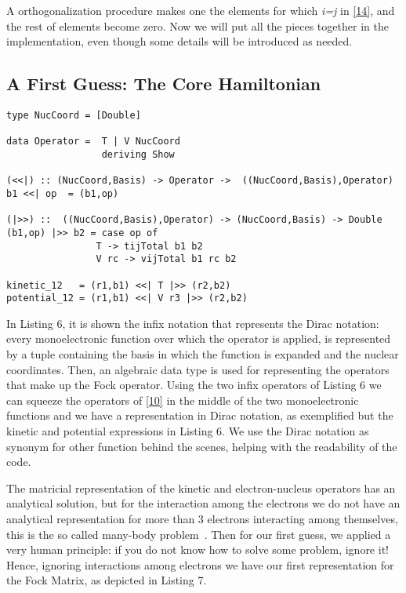 \documentclass{tmr}
\begin{document}
A orthogonalization procedure makes one the elements for which \textit{i=j} in \eqref{14}, and
the rest of elements become zero. Now we will put all the pieces together in the implementation, 
even though some details will be introduced as needed.


\subsection{A First Guess: The Core Hamiltonian}
\begin{lstlisting}[float,captionpos=b,belowcaptionskip=4pt, caption= Operators definition]
type NucCoord = [Double]

data Operator =  T | V NucCoord
                 deriving Show

(<<|) :: (NucCoord,Basis) -> Operator ->  ((NucCoord,Basis),Operator)
b1 <<| op  = (b1,op)

(|>>) ::  ((NucCoord,Basis),Operator) -> (NucCoord,Basis) -> Double
(b1,op) |>> b2 = case op of
                T -> tijTotal b1 b2
                V rc -> vijTotal b1 rc b2

kinetic_12   = (r1,b1) <<| T |>> (r2,b2)
potential_12 = (r1,b1) <<| V r3 |>> (r2,b2)
\end{lstlisting}

In Listing 6, it is shown the infix notation that represents the Dirac notation:
every monoelectronic function over which the operator is applied,
is represented by a tuple containing the basis in which the function is expanded 
and the nuclear coordinates. Then, an algebraic data type is used for representing the
operators that make up the Fock operator. Using the two infix operators of Listing 6
we can squeeze the operators of \eqref{10} in the middle of the
two monoelectronic functions and we have a representation in Dirac notation, as exemplified
but the kinetic and potential expressions in Listing 6. We use the Dirac notation as
synonym for other function behind the scenes, helping with the readability of the code.


The matricial representation of the kinetic and electron-nucleus operators has 
an analytical solution, but for the interaction among the electrons we do not have 
an analytical representation for more than 3 electrons interacting among themselves, this is the so called
many-body problem~\cite{many-body}. Then for our first guess,
we applied a very human principle: if you do not know how to solve some problem, ignore it!
Hence, ignoring interactions among electrons we have our first representation for 
the Fock Matrix, as depicted in Listing 7.
\end{document}
